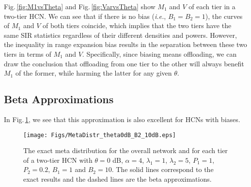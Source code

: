 \documentclass[12pt,draftclsnofoot,journal,onecolumn]{IEEEtran}
\def\figref#1{Fig.\,\ref{#1}}%
\def\ie{{\em i.e.}}
\newlength{\figwidth}
\begin{document}
\figref{fig:M1vsTheta} and \figref{fig:VarvsTheta} show $M_1$ and $V$ of each tier in a two-tier HCN. We can see that if there is no bias (\ie, $B_1=B_2=1$), the curves of $M_1$ and $V$ of both tiers coincide, which implies that the two tiers have the same SIR statistics regardless of their different densities and powers. However, the inequality in range expansion bias results in the separation between these two tiers in terms of $M_1$ and $V$. Specifically, since  biasing means offloading, we can draw the conclusion that offloading from one tier to the other will always benefit $M_1$ of the former, while harming the latter for any given $\theta$.  

\subsection{Beta Approximations} 
In \figref{fig:MetaDistr_theta0dB_B2_10dB}, we see that this approximation is also excellent for HCNs with biases.
\begin{figure} [!t]
	\begin{center}
		\texttt{[image: Figs/MetaDistr\_theta0dB\_B2\_10dB.eps]}
		\caption{The exact meta distribution for the overall network and for each tier of a two-tier HCN with $\theta=0$ dB, $\alpha=4$, $\lambda_1=1$, $\lambda_2=5$, $P_1=1$, $P_2=0.2$, $B_1=1$ and $B_2=10$. The solid lines correspond to the exact results and the dashed lines are the beta approximations.}
		\label{fig:MetaDistr_theta0dB_B2_10dB}
	\end{center}
\end{figure} 
\end{document}
